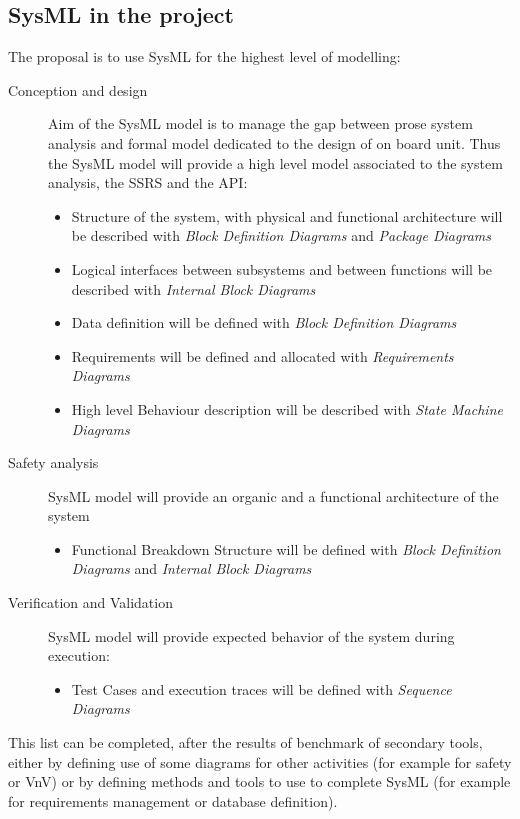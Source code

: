 \subsection{SysML in the project}

The proposal is to use SysML for the highest level of modelling:
\begin{description}
\item[Conception and design] Aim of the SysML model is to manage the gap  between prose system analysis and formal model dedicated to the design of on board unit. Thus the SysML model will provide a high level model associated to the system analysis, the SSRS and the API:
\begin{itemize}
\item Structure of the system, with physical and functional architecture will be described with \textit{Block Definition Diagrams} and \textit{Package Diagrams}
\item Logical interfaces between subsystems and between functions will be described with \textit{Internal Block Diagrams}
\item Data definition will be defined with \textit{Block Definition Diagrams}
\item Requirements will be defined and allocated with \textit{Requirements Diagrams}
\item High level Behaviour description will be described with \textit{State Machine Diagrams}
\end{itemize}
\item[Safety analysis] SysML model will provide an organic and a functional architecture of the system
\begin{itemize}
\item Functional Breakdown Structure will be defined with \textit{Block Definition Diagrams} and \textit{Internal Block Diagrams}
\end{itemize}
\item[Verification and Validation] SysML model will provide expected behavior of the system during execution: 
\begin{itemize}
\item Test Cases and execution traces will be defined with \textit{Sequence Diagrams}
\end{itemize}
\end{description}

This list can be completed, after the results of benchmark  of secondary tools, either by defining use of some diagrams for other activities (for example for safety or VnV) or by defining methods and tools to use to complete SysML (for example for requirements management or database definition).

